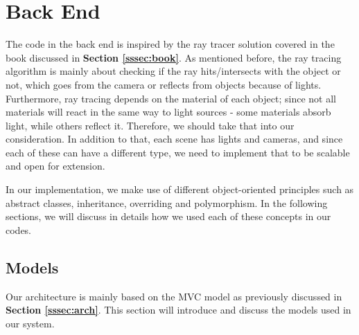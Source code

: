 \documentclass[a4paper]{report}
\begin{document}
	\label{ch:imp}\section{Back End}
	The code in the back end is inspired by the ray tracer solution covered in the book discussed in \textbf{Section \ref{sssec:book}}. As mentioned before, the ray tracing algorithm is mainly about checking if the ray hits/intersects with the object or not, which goes from the camera or reflects from objects because of lights. Furthermore, ray tracing depends on the material of each object; since not all materials will react in the same way to light sources - some materials absorb light, while others reflect it.    Therefore, we should take that into our consideration. In addition to that, each scene has lights and cameras, and since each of these can have a different type, we need to implement that to be scalable and open for extension.\newline
	\par In our implementation, we make use of different object-oriented principles such as abstract classes, inheritance, overriding and polymorphism. In the following sections, we will discuss in details how we used each of these concepts in our codes.
	\subsection{Models}
	Our architecture is mainly based on the MVC model as previously discussed in \textbf{Section \ref{sssec:arch}}. This section will introduce and discuss the models used in our system.
\end{document}
